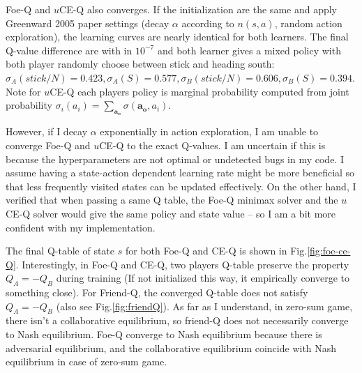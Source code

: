 \documentclass[conference]{IEEEtran}
\begin{document}
Foe-Q and $u$CE-Q also converges. If the initialization are the same and apply Greenward 2005 paper settings (decay $\alpha$ according to $n(s,a)$, random action exploration), the learning curves are nearly identical for both learners. The final Q-value difference are with in $10^{-7}$ and both learner gives a mixed policy with both player randomly choose between stick and heading south: $\sigma_A(stick/N)=0.423, \sigma_A(S)=0.577, \sigma_B(stick/N)=0.606, \sigma_B(S)=0.394$. Note for $u$CE-Q each players policy is  marginal probability computed from joint probability $\sigma_i(a_i) = \sum_{\mathbf{a_o}}\sigma(\mathbf{a_o}, a_i)$.

However, if I decay $\alpha$ exponentially in action exploration, I am unable to converge Foe-Q and $u$CE-Q to the exact Q-values. I am uncertain if this is because the hyperparameters are not optimal or undetected bugs in my code. I assume having a state-action dependent learning rate might be more beneficial so that less frequently visited states can be updated effectively. On the other hand, I verified that when passing a same Q table, the Foe-Q minimax solver and the $u$CE-Q solver would give the same policy and state value -- so I am a bit more confident with my implementation.

The final Q-table of state $s$ for both Foe-Q and CE-Q is shown in Fig.\ref{fig:foe-ce-Q}. Interestingly, in Foe-Q and CE-Q, two players Q-table preserve the property $Q_A = -Q_B$ during training (If not initialized this way, it empirically converge to something close). For Friend-Q, the converged Q-table does not satisfy $Q_A = -Q_B$ (also see Fig.\ref{fig:friendQ}). As far as I understand, in zero-sum game, there isn't a collaborative equilibrium, so friend-Q does not necessarily converge to Nash equilibrium. Foe-Q converge to Nash equilibrium because there is adversarial equilibrium, and the collaborative equilibrium coincide with Nash equilibrium in case of zero-sum game.
\end{document}

